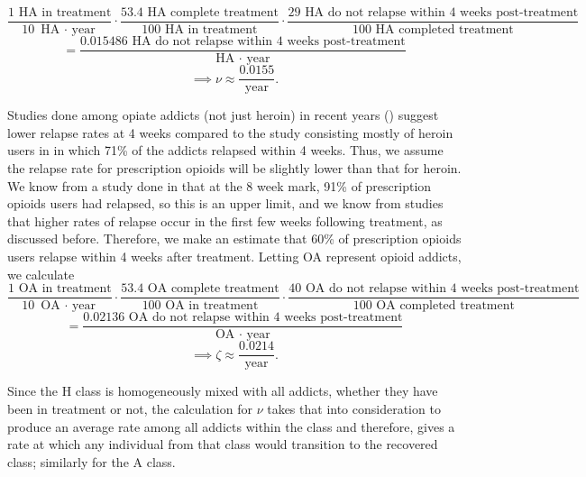 \documentclass[12pt]{article}
\begin{document}
$$\frac{1 \text{ HA in treatment}}{10 \text{ HA $\cdot$ year}} \cdot \frac{53.4 \text{ HA complete treatment}}{100 \text{ HA in treatment}} \cdot \frac{29 \text{ HA do not relapse within 4 weeks post-treatment}}{100 \text{ HA completed treatment}}$$
$$= \frac{0.015486 \text{ HA do not relapse within 4 weeks post-treatment}}{\text{HA $\cdot$ year}}$$
$$\implies \nu \approx \frac{0.0155}{\text{year}}.$$

Studies done among opiate addicts (not just heroin) in recent years (\cite{Bailey, Broers}) suggest lower relapse rates at 4 weeks compared to the study consisting mostly of heroin users in \cite{Smyth} in which 71\% of the addicts relapsed within 4 weeks. Thus, we assume the relapse rate for prescription opioids will be slightly lower than that for heroin. We know from a study done in \cite{Weiss} that at the 8 week mark, 91\% of prescription opioids users had relapsed, so this is an upper limit, and we know from studies that higher rates of relapse occur in the first few weeks following treatment, as discussed before. Therefore, we make an estimate that 60\% of prescription opioids users relapse within 4 weeks after treatment. Letting OA represent opioid addicts, we calculate 
$$\frac{1 \text{ OA in treatment}}{10 \text{ OA $\cdot$ year}} \cdot \frac{53.4 \text{ OA complete treatment}}{100 \text{ OA in treatment}} \cdot \frac{40 \text{ OA do not relapse within 4 weeks post-treatment}}{100 \text{ OA completed treatment}}$$
$$= \frac{0.02136 \text{ OA do not relapse within 4 weeks post-treatment}}{\text{OA $\cdot$ year}}$$
$$\implies \zeta \approx  \frac{0.0214}{\text{year}}.$$


Since the H class is homogeneously mixed with all addicts, whether they have been in treatment or not, the calculation for $\nu$ takes that into consideration to produce an average rate among all addicts within the class and therefore, gives a rate at which any individual from that class would transition to the recovered class; similarly for the A class.\\
\end{document}
